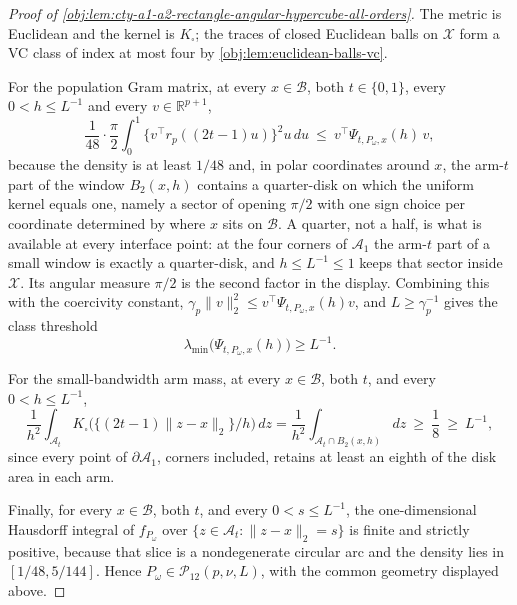 \documentclass[11pt]{article}
\begin{document}
\begin{proof}[Proof of \cref{obj:lem:cty-a1-a2-rectangle-angular-hypercube-all-orders}]
The metric is Euclidean and the kernel is \(K_\square\); the traces of closed Euclidean balls on \(\mathcal X\) form a VC class of index at most four by \cref{obj:lem:euclidean-balls-vc}.

For the population Gram matrix, at every \(x\in\mathcal B\), both \(t\in\{0,1\}\), every \(0<h\leq L^{-1}\) and every \(v\in\mathbb R^{p+1}\),
\[
\frac1{48}\cdot\frac\pi2
\int_0^1\bigl\{v^\top r_p((2t-1)u)\bigr\}^2u\,du
\ \leq\
v^\top\Psi_{t,P_\omega,x}(h)\,v ,
\]
because the density is at least \(1/48\) and, in polar coordinates around \(x\), the arm-\(t\) part of the window \(B_2(x,h)\) contains a quarter-disk on which the uniform kernel equals one, namely a sector of opening \(\pi/2\) with one sign choice per coordinate determined by where \(x\) sits on \(\mathcal B\).  A quarter, not a half, is what is available at every interface point: at the four corners of \(\mathcal A_1\) the arm-\(t\) part of a small window is exactly a quarter-disk, and \(h\leq L^{-1}\leq1\) keeps that sector inside \(\mathcal X\).  Its angular measure \(\pi/2\) is the second factor in the display.  Combining this with the coercivity constant, \(\gamma_p\lVert v\rVert_2^2\leq v^\top\Psi_{t,P_\omega,x}(h)v\), and \(L\geq\gamma_p^{-1}\) gives the class threshold
\[
\lambda_{\min}\bigl(\Psi_{t,P_\omega,x}(h)\bigr)\geq L^{-1}.
\]

For the small-bandwidth arm mass, at every \(x\in\mathcal B\), both \(t\), and every \(0<h\leq L^{-1}\),
\[
\frac1{h^2}\int_{\mathcal A_t}
K_\square\bigl(\{(2t-1)\lVert z-x\rVert_2\}/h\bigr)\,dz
=
\frac1{h^2}\int_{\mathcal A_t\cap B_2(x,h)}dz
\ \geq\
\frac18
\ \geq\
L^{-1},
\]
since every point of \(\partial\mathcal A_1\), corners included, retains at least an eighth of the disk area in each arm.

Finally, for every \(x\in\mathcal B\), both \(t\), and every \(0<s\leq L^{-1}\), the one-dimensional Hausdorff integral of \(f_{P_\omega}\) over \(\{z\in\mathcal A_t:\lVert z-x\rVert_2=s\}\) is finite and strictly positive, because that slice is a nondegenerate circular arc and the density lies in \([1/48,5/144]\).
Hence \(P_\omega\in\mathcal P_{12}(p,\nu,L)\), with the common geometry displayed above.


\end{proof}
\end{document}
